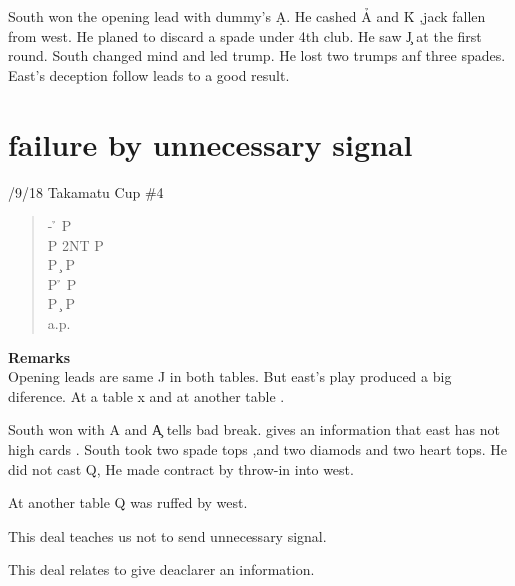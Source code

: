 South won the opening lead with dummy's \d A. He cashed 
\h A and \h K ,jack fallen from west. He planed to discard
a spade under 4th club. He saw \c J at the first round.
South changed mind and led trump. He lost two trumps anf three spades.
East's deception follow leads to a good result.


\section{failure by unnecessary signal }



/9/18 Takamatu Cup \#4
\begin{quote}
%
  {}%
  {}
  {}%
  {}%
\end{quote}
\begin{quote}
\begin{bidding}
- \h  \> P \d \\
P  \> 2NT \> P \c \\
P \c \> P \d \\
P \h \> P \s \\
P \c \> P \d \\
a.p.
\end{bidding}
\end{quote}
{\bf Remarks}\\

Opening leads are same \s J in both tables.
But east's play produced a big diference. At a table \s x and 
at another table .

South won with \s A and \c A tells bad break.
 gives an information that  east has not high cards .
South took two spade tops ,and two diamods and two heart tops.
He did not cast \s Q, He made contract by throw-in into west.

At another table \s Q was ruffed by west.

This deal teaches us not to send unnecessary signal.



\vspace{0.5cm}

This deal relates to give deaclarer an information.\\

